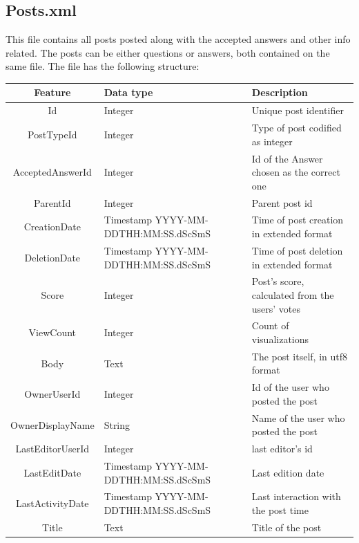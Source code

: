 \documentclass[11pt]{book} %
\begin{document}
\newpage

    \subsection{Posts.xml}

      This file contains all posts posted along with the accepted answers and other info related. The posts can be either questions or answers, both contained on the same file. The file has the following structure:

      \begin{table}[!ht]
        \centering
        \begin{tabular}{|c|p{}|p{}|}
          \hline

          Feature & Data type & Description \\ \hline
          Id & Integer & Unique post identifier \\ \hline
          PostTypeId & Integer & Type of post codified as integer \\ \hline
          AcceptedAnswerId & Integer & Id of the Answer chosen as the correct one \\ \hline
          ParentId & Integer & Parent post id\\ \hline
          CreationDate & Timestamp YYYY-MM-DDTHH:MM:SS.dScSmS & Time of post creation in extended format \\ \hline
          DeletionDate & Timestamp YYYY-MM-DDTHH:MM:SS.dScSmS & Time of post deletion in extended format \\ \hline
          Score & Integer & Post's score, calculated from the users' votes \\ \hline
          ViewCount & Integer & Count of visualizations \\ \hline
          Body & Text & The post itself, in utf8 format \\ \hline
          OwnerUserId & Integer & Id of the user who posted the post \\ \hline
          OwnerDisplayName & String & Name of the user who posted the post \\ \hline
          LastEditorUserId & Integer & last editor's id\\ \hline
          LastEditDate & Timestamp YYYY-MM-DDTHH:MM:SS.dScSmS & Last edition date \\ \hline
          LastActivityDate & Timestamp YYYY-MM-DDTHH:MM:SS.dScSmS & Last interaction with the post time \\ \hline
          Title & Text & Title of the post \\ \hline

\end{tabular}
\end{table}
\end{document}

